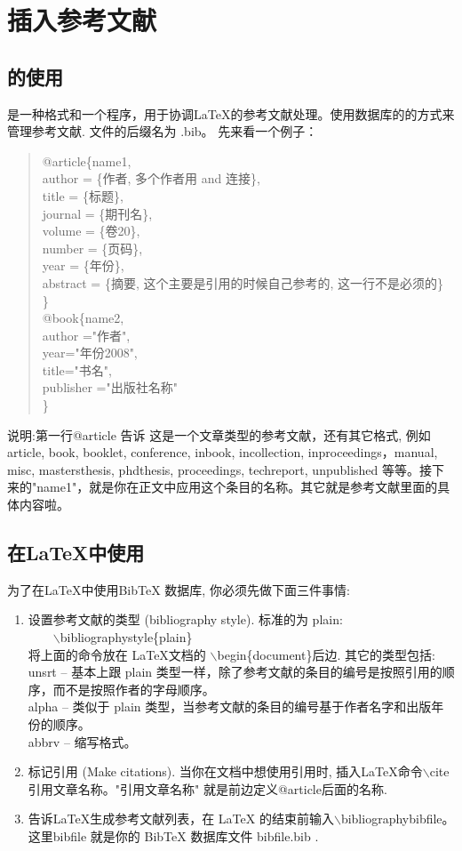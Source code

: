 
\chapter{插入参考文献}
\section{\BibTeX 的使用}
\BibTeX 是一种格式和一个程序，用于协调LaTeX的参考文献处理。\BibTeX 使用数据库的的方式来管理参考文献. \BibTeX 文件的后缀名为 .bib。 先来看一个例子：
\begin{quote}
@article\{name1,\\
author = \{作者, 多个作者用 and 连接\},\\
title = \{标题\},\\
journal = \{期刊名\},\\
volume = \{卷20\},\\
number = \{页码\},\\
year = \{年份\},\\
abstract = \{摘要, 这个主要是引用的时候自己参考的, 这一行不是必须的\}\\
\}\\

@book\{name2,\\
author ="作者",\\
year="年份2008",\\
title="书名",\\
publisher ="出版社名称"\\
\}
\end{quote}
说明:第一行@article 告诉 \BibTeX 这是一个文章类型的参考文献，还有其它格式, 例如 article, book, booklet, conference, inbook, incollection, inproceedings，manual, misc, mastersthesis, phdthesis, proceedings, techreport, unpublished 等等。接下来的"name1"，就是你在正文中应用这个条目的名称。其它就是参考文献里面的具体内容啦。
\section{在\LaTeX 中使用\BibTeX }
为了在LaTeX中使用BibTeX 数据库, 你必须先做下面三件事情:
\begin{enumerate}
\item 设置参考文献的类型 (bibliography style). 标准的为 plain:\\
　　$\backslash$bibliographystyle\{plain\}\\
将上面的命令放在 \LaTeX 文档的 $\backslash$begin\{document\}后边. 其它的类型包括:\\
unsrt – 基本上跟 plain 类型一样，除了参考文献的条目的编号是按照引用的顺序，而不是按照作者的字母顺序。\\
alpha – 类似于 plain 类型，当参考文献的条目的编号基于作者名字和出版年份的顺序。\\
abbrv – 缩写格式。
\item 标记引用 (Make citations). 当你在文档中想使用引用时, 插入\LaTeX 命令$\backslash$cite{引用文章名称}。"引用文章名称" 就是前边定义@article后面的名称.
\item 告诉LaTeX生成参考文献列表，在 LaTeX 的结束前输入$\backslash$bibliography{bibfile}。这里bibfile 就是你的 BibTeX 数据库文件 bibfile.bib .
\end{enumerate}

